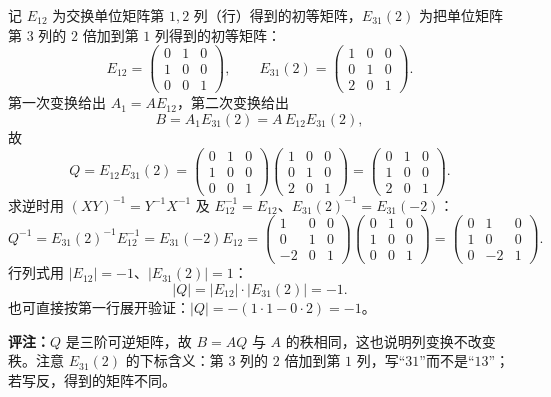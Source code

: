 记 \(E_{12}\) 为交换单位矩阵第 \(1,2\) 列（行）得到的初等矩阵，\(E_{31}(2)\) 为把单位矩阵第 \(3\) 列的 \(2\) 倍加到第 \(1\) 列得到的初等矩阵：
\[
E_{12}=\begin{pmatrix}0&1&0\\1&0&0\\0&0&1\end{pmatrix},
\qquad
E_{31}(2)=\begin{pmatrix}1&0&0\\0&1&0\\2&0&1\end{pmatrix}.
\]
第一次变换给出 \(A_1=AE_{12}\)，第二次变换给出
\[
B=A_1E_{31}(2)=A\,E_{12}E_{31}(2),
\]
故
\[
Q=E_{12}E_{31}(2)
=\begin{pmatrix}0&1&0\\1&0&0\\0&0&1\end{pmatrix}
\begin{pmatrix}1&0&0\\0&1&0\\2&0&1\end{pmatrix}
=\begin{pmatrix}0&1&0\\1&0&0\\2&0&1\end{pmatrix}.
\]
求逆时用 \((XY)^{-1}=Y^{-1}X^{-1}\) 及 \(E_{12}^{-1}=E_{12}\)、\(E_{31}(2)^{-1}=E_{31}(-2)\)：
\[
Q^{-1}=E_{31}(2)^{-1}E_{12}^{-1}
=E_{31}(-2)E_{12}
=\begin{pmatrix}1&0&0\\0&1&0\\-2&0&1\end{pmatrix}
\begin{pmatrix}0&1&0\\1&0&0\\0&0&1\end{pmatrix}
=\begin{pmatrix}0&1&0\\1&0&0\\0&-2&1\end{pmatrix}.
\]
行列式用 \(|E_{12}|=-1\)、\(|E_{31}(2)|=1\)：
\[
|Q|=|E_{12}|\cdot|E_{31}(2)|=-1.
\]
也可直接按第一行展开验证：\(|Q|=-(1\cdot 1-0\cdot 2)=-1\)。

\textbf{评注：}\(Q\) 是三阶可逆矩阵，故 \(B=AQ\) 与 \(A\) 的秩相同，这也说明列变换不改变秩。注意 \(E_{31}(2)\) 的下标含义：第 \(3\) 列的 \(2\) 倍加到第 \(1\) 列，写“\(31\)”而不是“\(13\)”；若写反，得到的矩阵不同。

\else \answerarea[8] \fi%
